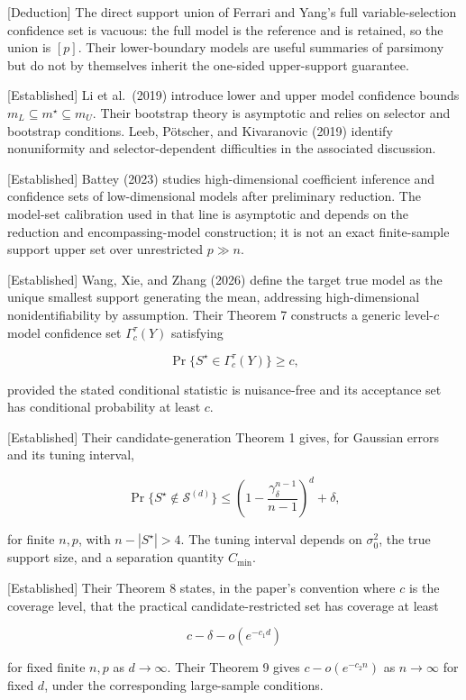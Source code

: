 \documentclass[
  english,
  11pt,
  a4paper,
]{article}
\begin{document}
{[}Deduction{]} The direct support union of Ferrari and Yang's full
variable-selection confidence set is vacuous: the full model is the
reference and is retained, so the union is $[p]$. Their lower-boundary
models are useful summaries of parsimony but do not by themselves
inherit the one-sided upper-support guarantee.

{[}Established{]} Li et al.~(2019) introduce lower and upper model
confidence bounds $m_L\subseteq m^\star\subseteq m_U$. Their bootstrap
theory is asymptotic and relies on selector and bootstrap conditions.
Leeb, Pötscher, and Kivaranovic (2019) identify nonuniformity and
selector-dependent difficulties in the associated discussion.

{[}Established{]} Battey (2023) studies high-dimensional coefficient
inference and confidence sets of low-dimensional models after
preliminary reduction. The model-set calibration used in that line is
asymptotic and depends on the reduction and encompassing-model
construction; it is not an exact finite-sample support upper set over
unrestricted $p\gg n$.

{[}Established{]} Wang, Xie, and Zhang (2026) define the target true
model as the unique smallest support generating the mean, addressing
high-dimensional nonidentifiability by assumption. Their Theorem 7
constructs a generic level-$c$ model confidence set
$\Gamma_c^\tau(Y)$ satisfying

$$
\Pr\{S^\star\in\Gamma_c^\tau(Y)\}\ge c,
$$

provided the stated conditional statistic is nuisance-free and its
acceptance set has conditional probability at least $c$.

{[}Established{]} Their candidate-generation Theorem 1 gives, for
Gaussian errors and its tuning interval,

$$
\Pr\{S^\star\notin\mathcal S^{(d)}\}
\le
\left(1-\frac{\gamma_\delta^{n-1}}{n-1}\right)^d+\delta,
$$

for finite $n,p$, with $n-|S^\star|>4$. The tuning interval depends
on $\sigma_0^2$, the true support size, and a separation quantity
$C_{\min}$.

{[}Established{]} Their Theorem 8 states, in the paper's convention
where $c$ is the coverage level, that the practical
candidate-restricted set has coverage at least

$$
c-\delta-o(e^{-c_1d})
$$

for fixed finite $n,p$ as $d\to\infty$. Their Theorem 9 gives
$c-o(e^{-c_2n})$ as $n\to\infty$ for fixed $d$, under the
corresponding large-sample conditions.
\end{document}
